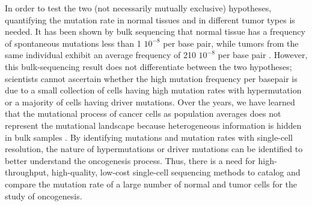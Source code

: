 In order to test the two (not necessarily mutually exclusive) hypotheses, quantifying the mutation rate in normal tissues and in different tumor types is needed. It has been shown by bulk sequencing that normal tissue has a frequency of spontaneous mutations less than 1 \times $10^{-8}$ per base pair, while tumors from the same individual exhibit an average frequency of 210 \times $10^{-8}$ per base pair \cite{Bielas:2006cj}. However, this bulk-sequencing result does not differentiate between the two hypotheses; scientists cannot ascertain whether the high mutation frequency per basepair is due to a small collection of cells having high mutation rates with hypermutation or a majority of cells having driver mutations. Over the years, we have learned that the mutational process of cancer cells as population averages does not represent the mutational landscape because heterogeneous information is hidden in bulk samples \cite{Navin:2011jq,Zong:2012bs,Li:2011uq}. By identifying mutations and mutation rates with single-cell resolution, the nature of hypermutations or driver mutations can be identified to better understand the oncogenesis process. Thus, there is a need for high-throughput, high-quality, low-cost single-cell sequencing methods to catalog and compare the mutation rate of a large number of normal and tumor cells for the study of oncogenesis. 

